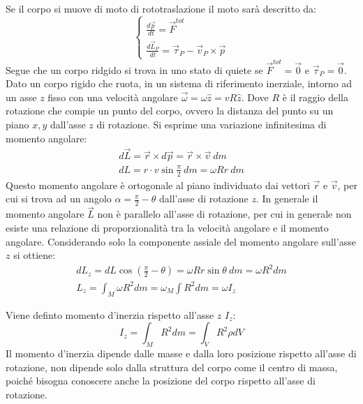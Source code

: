 \documentclass{article}
\numberwithin{equation}{subsection}
\begin{document}
Se il corpo si muove di moto di rototraslazione il moto sarà descritto da:
\begin{equation}
    \begin{cases}
        \displaystyle\frac{d\vec{p}}{dt}=\vec{F}^{tot}\\
        \displaystyle\frac{d\vec{L}_P}{dt}=\vec{\tau}_P-\vec{v}_P\times\vec{p}
    \end{cases}
\end{equation}
Segue che un corpo ridgido si trova in uno stato di quiete se 
$\vec{F}^{tot}=\vec{0}$ e $\vec{\tau}_P=\vec{0}$. 
\\
Dato un corpo rigido che ruota, in un sistema di riferimento inerziale, intorno ad un asse $z$ fisso con una 
velocità angolare $\vec{\omega}=\omega\hat{z}=vR\hat{z}$. Dove 
$R$ è il raggio della rotazione che compie un punto del corpo, ovvero la distanza del punto su un piano $x,y$ 
dall'asse $z$ di rotazione. Si esprime una variazione infinitesima di momento angolare: 
\begin{gather*}
    d\vec{L}=\vec{r}\times d\vec{p}=\vec{r}\times\vec{v}\:dm\\
    dL=r\cdot v\sin\displaystyle\frac{\pi}{2}\:dm=\omega Rr\:dm
\end{gather*}
Questo momento angolare è ortogonale al piano individuato dai vettori $\vec{r}$ e $\vec{v}$, per cui si trova ad un angolo $\alpha=\displaystyle\frac{\pi}{2}-\theta$ dall'asse 
di rotazione $z$. In generale il momento angolare $\vec{L}$ non è parallelo all'asse di rotazione, per cui in generale non esiste una relazione di proporzionalità tra la velocità angolare 
e il momento angolare. Considerando solo la componente assiale del momento angolare sull'asse $z$ si ottiene: 
\begin{gather*}
    dL_z=dL\cos\left(\displaystyle\frac{\pi}{2}-\theta\right)=\omega Rr\sin\theta\:dm=\omega R^2dm\\
    L_z=\displaystyle\int_M\omega R^2dm=\omega_M\int R^2dm=\omega I_z
\end{gather*}

Viene definto momento d'inerzia rispetto all'asse $z$ $I_z$: 
\begin{equation}
    I_z=\displaystyle\int_M R^2dm=\int_V R^2\rho dV
\end{equation}
Il momento d'inerzia dipende dalle masse e dalla loro posizione rispetto all'asse di rotazione, non dipende solo dalla struttura del corpo come il centro di massa, poiché 
bisogna conoscere anche la posizione del corpo rispetto all'asse di rotazione. 
\end{document}
